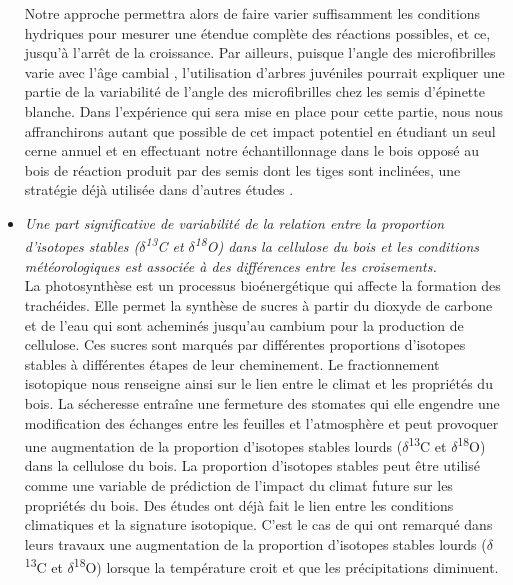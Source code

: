 \documentclass[a4paper,12pt]{report}
\newcommand{\Ctreize}{$\delta$\textsuperscript{13}C\xspace}
\newcommand{\Odixhuit}{$\delta$\textsuperscript{18}O\xspace}
\begin{document}
\begin{itemize}
	Notre approche permettra alors de faire varier suffisamment les conditions hydriques pour mesurer une étendue complète des réactions possibles, et ce, jusqu'à l'arrêt de la croissance. Par ailleurs, puisque l'angle des microfibrilles varie avec l'âge cambial \citep{Lindstrom1998}, l'utilisation d'arbres juvéniles pourrait expliquer une partie de la variabilité de l'angle des microfibrilles chez les semis d'épinette blanche. Dans l'expérience qui sera mise en place pour cette partie, nous nous affranchirons autant que possible de cet impact potentiel en étudiant un seul cerne annuel et en effectuant notre échantillonnage dans le bois opposé au bois de réaction produit par des semis dont les tiges sont inclinées, une stratégie déjà utilisée dans d'autres études \citep{Apiolaza2011}.\\  
	
	\item \emph{Une part significative de variabilité de la relation entre la proportion d'isotopes stables (\Ctreize et \Odixhuit) dans la cellulose du bois et les conditions météorologiques est associée à des différences entre les croisements.} \\ %
	
	
	La photosynthèse est un processus bioénergétique qui affecte la formation des trachéides. Elle permet la synthèse de sucres à partir du dioxyde de carbone et de l'eau qui sont acheminés jusqu'au cambium pour la production de cellulose. Ces sucres sont marqués par différentes proportions d'isotopes stables à différentes étapes de leur cheminement. Le fractionnement isotopique nous renseigne ainsi sur le lien entre le climat et les propriétés du bois. La sécheresse entraîne une fermeture des stomates \citep{Farquhar1989, Farquhar1993, Nicolas2017} qui elle engendre une modification des échanges entre les feuilles et l'atmosphère et peut provoquer une augmentation de la proportion d'isotopes stables lourds (\Ctreize et \Odixhuit) \citep{McCarroll2004,Skomarkova2006,Vaganov2009,Cernusak2015} dans la cellulose du bois. La proportion d'isotopes stables peut 
	être utilisé comme une variable de prédiction de l'impact du climat future sur les propriétés du bois. Des études ont déjà fait le lien entre les conditions climatiques et la signature isotopique. C'est le cas de  \cite{Seftigen2011} qui ont remarqué dans leurs travaux une augmentation de la proportion d'isotopes stables lourds (\Ctreize et \Odixhuit) lorsque la température croit et que les précipitations diminuent.\\
	

\end{itemize}
\end{document}
